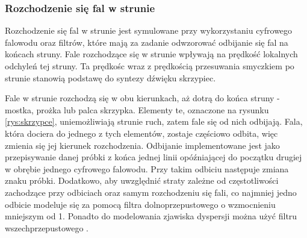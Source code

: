 \subsubsection{Rozchodzenie się fal w strunie}
Rozchodzenie się fal w strunie jest symulowane przy wykorzystaniu cyfrowego falowodu oraz filtrów, które mają za zadanie odwzorować odbijanie się fal na końcach struny. Fale rozchodzące się w strunie wpływają na prędkość lokalnych odchyleń tej struny. Ta prędkośc wraz z prędkością przesuwania smyczkiem po strunie stanowią podstawę do syntezy dźwięku skrzypiec. 


Fale w strunie rozchodzą się w obu kierunkach, aż dotrą do końca struny - mostka, prożka lub palca skrzypka. Elementy te, oznaczone na rysunku \ref{rys:skrzypce}, uniemożliwiają strunie ruch, zatem fale się od nich odbijają. Fala, która dociera do jednego z tych elementów, zostaje częściowo odbita, więc zmienia się jej kierunek rozchodzenia. Odbijanie implementowane jest jako przepisywanie danej próbki z końca jednej linii opóźniającej do początku drugiej w obrębie jednego cyfrowego falowodu. Przy takim odbiciu następuje zmiana znaku próbki.
Dodatkowo, aby uwzględnić straty zależne od częstotliwości zachodzące przy odbiciach oraz samym rozchodzeniu się fali, co najmniej jedno odbicie modeluje się za pomocą filtra dolnoprzepustowego o wzmocnieniu mniejszym od 1. 
Ponadto do modelowania zjawiska dyspersji można użyć filtru wszechprzepustowego \cite{allpass}.


